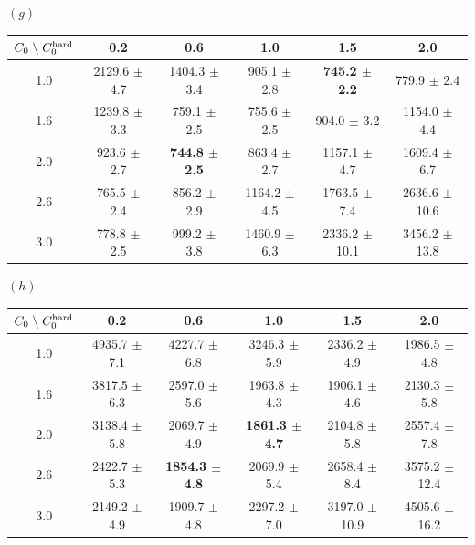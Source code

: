 \documentclass[aos,preprint]{imsart}
\theoremstyle{plain}
\theoremstyle{definition}
\begin{document}
\begin{appendix}
\begin{table}[!t]
$(g)$
\begin{tabular}{c|ccccc}
\hline
$C_0\;\backslash \; C_0^{\textup{hard}}$  & 0.2              & 0.6              & 1.0                & 1.5               & 2.0                 \\ \hline
1.0   & 2129.6 $\pm$ 4.7 & 1404.3 $\pm$ 3.4 & 905.1 $\pm$ 2.8  & \textbf{745.2 $\pm$ 2.2}   & 779.9 $\pm$ 2.4   \\
1.6 & 1239.8 $\pm$ 3.3 & 759.1 $\pm$ 2.5  & 755.6 $\pm$ 2.5  & 904.0 $\pm$ 3.2     & 1154.0 $\pm$ 4.4    \\
2.0   & 923.6 $\pm$ 2.7  & \textbf{744.8 $\pm$ 2.5}  & 863.4 $\pm$ 2.7  & 1157.1 $\pm$ 4.7  & 1609.4 $\pm$ 6.7  \\
2.6 & 765.5 $\pm$ 2.4  & 856.2 $\pm$ 2.9  & 1164.2 $\pm$ 4.5 & 1763.5 $\pm$ 7.4  & 2636.6 $\pm$ 10.6 \\
3.0   & 778.8 $\pm$ 2.5  & 999.2 $\pm$ 3.8  & 1460.9 $\pm$ 6.3 & 2336.2 $\pm$ 10.1 & 3456.2 $\pm$ 13.8 \\ 
\end{tabular}

\medskip


$(h)$
\begin{tabular}{c|ccccc}
\hline
$C_0\;\backslash \; C_0^{\textup{hard}}$ & 0.2          & 0.6          & 1.0            & 1.5          & 2.0             \\ \hline
1.0   & 4935.7 $\pm$ 7.1 & 4227.7 $\pm$ 6.8 & 3246.3 $\pm$ 5.9 & 2336.2 $\pm$ 4.9 & 1986.5 $\pm$ 4.8  \\
1.6 & 3817.5 $\pm$ 6.3 & 2597.0 $\pm$ 5.6   & 1963.8 $\pm$ 4.3 & 1906.1 $\pm$ 4.6 & 2130.3 $\pm$ 5.8  \\
2.0   & 3138.4 $\pm$ 5.8 & 2069.7 $\pm$ 4.9 & \textbf{1861.3 $\pm$ 4.7} & 2104.8 $\pm$ 5.8 & 2557.4 $\pm$ 7.8  \\
2.6 & 2422.7 $\pm$ 5.3 & \textbf{1854.3 $\pm$ 4.8} & 2069.9 $\pm$ 5.4 & 2658.4 $\pm$ 8.4 & 3575.2 $\pm$ 12.4 \\
3.0   & 2149.2 $\pm$ 4.9 & 1909.7 $\pm$ 4.8 & 2297.2 $\pm$ 7.0   & 3197.0 $\pm$ 10.9  & 4505.6 $\pm$ 16.2 
\end{tabular}
\end{table}
\end{appendix}

%
\end{document}
